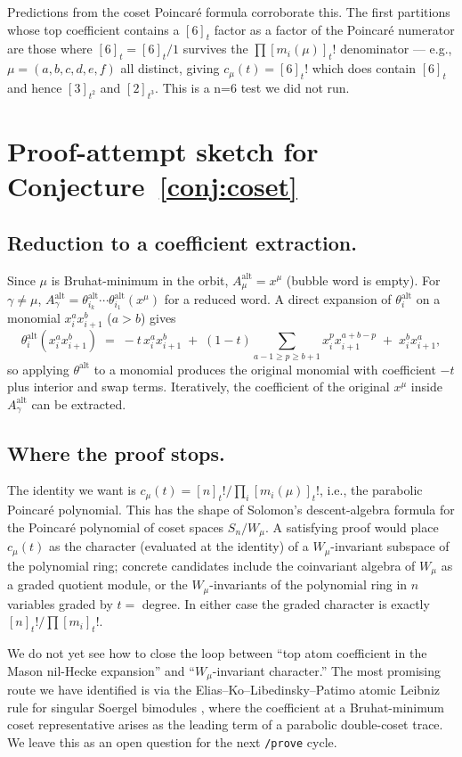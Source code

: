 \documentclass[11pt,letterpaper]{amsart}
\theoremstyle{definition}
\theoremstyle{remark}
\newcommand{\Aalt}{A^{\mathrm{alt}}}
\newcommand{\thalt}{\theta^{\mathrm{alt}}}
\begin{document}
Predictions from the coset Poincar\'e formula corroborate this. The
first partitions whose top coefficient contains a $[6]_t$ factor as a
factor of the Poincar\'e numerator are those where $[6]_t = [6]_t / 1$
survives the $\prod [m_i(\mu)]_t!$ denominator ---
e.g., $\mu = (a, b, c, d, e, f)$ all distinct, giving
$c_\mu(t) = [6]_t!$ which does contain $[6]_t$ and hence $[3]_{t^2}$ and
$[2]_{t^3}$. This is a n=6 test we did not run.

\section{Proof-attempt sketch for Conjecture~\ref{conj:coset}}

\subsection*{Reduction to a coefficient extraction.}
Since $\mu$ is Bruhat-minimum in the orbit, $\Aalt_\mu = x^\mu$ (bubble
word is empty). For $\gamma \ne \mu$, $\Aalt_\gamma = \thalt_{i_k}\cdots
\thalt_{i_1}(x^\mu)$ for a reduced word. A direct expansion of $\thalt_i$
on a monomial $x_i^a x_{i+1}^b$ ($a > b$) gives
\[
  \thalt_i(x_i^a x_{i+1}^b)
    \;=\; -t\, x_i^a x_{i+1}^b \;+\; (1-t)\sum_{a-1 \ge p \ge b+1} x_i^p x_{i+1}^{a+b-p}
    \;+\; x_i^b x_{i+1}^a,
\]
so applying $\thalt$ to a monomial produces the original monomial with
coefficient $-t$ plus interior and swap terms. Iteratively, the
coefficient of the original $x^\mu$ inside $\Aalt_\gamma$ can be extracted.

\subsection*{Where the proof stops.}
The identity we want is
$c_\mu(t) = [n]_t! / \prod_i [m_i(\mu)]_t!$, i.e., the parabolic
Poincar\'e polynomial. This has the shape of Solomon's descent-algebra
formula for the Poincar\'e polynomial of coset spaces $S_n / W_\mu$.
A satisfying proof would place $c_\mu(t)$ as the character (evaluated at
the identity) of a $W_\mu$-invariant subspace of the polynomial ring;
concrete candidates include the coinvariant algebra of $W_\mu$ as a
graded quotient module, or the $W_\mu$-invariants of the polynomial ring
in $n$ variables graded by $t = $ degree. In either case the graded
character is exactly $[n]_t! / \prod [m_i]_t!$.

We do not yet see how to close the loop between ``top atom coefficient
in the Mason nil-Hecke expansion'' and ``$W_\mu$-invariant character.''
The most promising route we have identified is via the Elias--Ko--Libedinsky--Patimo
atomic Leibniz rule for singular Soergel bimodules \cite{eklp2024},
where the coefficient at a Bruhat-minimum coset representative arises
as the leading term of a parabolic double-coset trace. We leave this as
an open question for the next \texttt{/prove} cycle.
\end{document}
